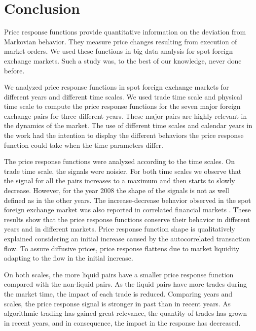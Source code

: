 \section{Conclusion}\label{sec:conclusion}

Price response functions provide quantitative information on the deviation from
Markovian behavior. They measure price changes resulting from execution of
market orders. We used these functions in big data analysis for spot foreign
exchange markets. Such a study was, to the best of our knowledge, never done
before.

We analyzed price response functions in spot foreign exchange markets for
different years and different time scales. We used trade time scale and
physical time scale to compute the price response functions for the seven major
foreign exchange pairs for three different years. These major pairs are highly
relevant in the dynamics of the market. The use of different time scales and
calendar years in the work had the intention to display the different behaviors
the price response function could take when the time parameters differ.

The price response functions were analyzed according to the time scales. On
trade time scale, the signals were noisier. For both time scales we observe
that the signal for all the pairs increases to a maximum and then starts to
slowly decrease. However, for the year 2008 the shape of the signals is not as
well defined as in the other years. The increase-decrease behavior observed in
the spot foreign exchange market was also reported in correlated financial
markets \cite{my_paper_response_financial,Wang_2016_avg}. These results show
that the price response functions conserve their behavior in different years
and in different markets. Price response function shape is qualitatively
explained considering an initial increase caused by the autocorrelated
transaction flow. To assure diffusive prices, price response flattens due to
market liquidity adapting to the flow in the initial increase.

On both scales, the more liquid pairs have a smaller price response function
compared with the non-liquid pairs. As the liquid pairs have more trades during
the market time, the impact of each trade is reduced. Comparing years and
scales, the price response signal is stronger in past than in recent years. As
algorithmic trading has gained great relevance, the quantity of trades has
grown in recent years, and in consequence, the impact in the response has
decreased.

